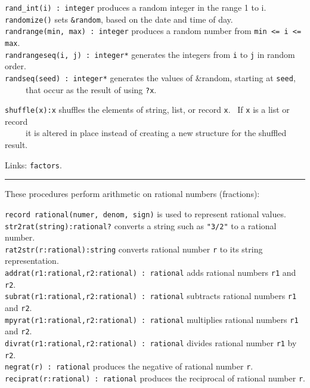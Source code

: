 \texttt{rand\_int(i) : integer} produces a random integer in the range 1
to i.\\
\texttt{randomize()} sets \texttt{\&random}, based on the
date and time of day. \\
\texttt{randrange(min, max) : integer} produces a random number from
\texttt{min {\textless}= i {\textless}= max}.\\
\texttt{randrangeseq(i, j) : integer*} generates the integers from
\texttt{i} to \texttt{j} in random order.\\
\texttt{randseq(seed) : integer*} generates the values of \&random,
starting at \texttt{seed},\\
 \ \ \ \ \ that occur as the result of using \texttt{?x}.

\texttt{shuffle(x):x} shuffles the elements of string, list, or record
\texttt{x}. \ If \texttt{x} is a list or record\\
 \ \ \ \ \ it is altered in place instead of creating a new structure for
the shuffled result.

Links: \texttt{factors}.

\vspace{0.25cm}\hrule{}

These procedures perform arithmetic on rational
numbers (fractions):

\texttt{record rational(numer, denom, sign)} is used to represent
rational values.\\
\texttt{str2rat(string):rational?} converts a string such as
\texttt{"3/2"} to a rational
number.\\
\texttt{rat2str(r:rational):string} converts rational number \texttt{r}
to its string representation.\\
\texttt{addrat(r1:rational,r2:rational) : rational} adds rational
numbers \texttt{r1} and \texttt{r2}.\\
\texttt{subrat(r1:rational,r2:rational) : rational} subtracts rational
numbers \texttt{r1} and \texttt{r2}.\\
\texttt{mpyrat(r1:rational,r2:rational) : rational} multiplies rational
numbers \texttt{r1} and \texttt{r2}.\\
\texttt{divrat(r1:rational,r2:rational) : rational} divides rational
number \texttt{r1} by \texttt{r2}.\\
\texttt{negrat(r) : rational} produces the negative of rational number
\texttt{r}.\\
\texttt{reciprat(r:rational) : rational} produces the reciprocal of
rational number \texttt{r}.

